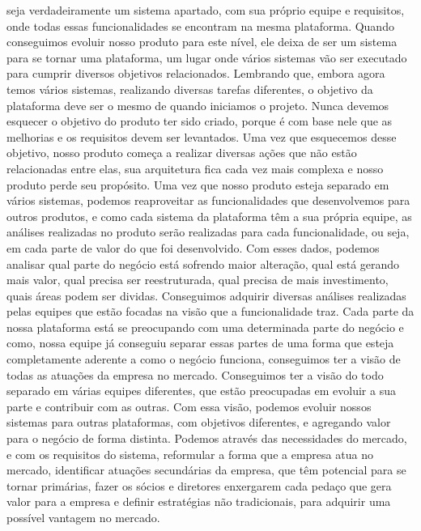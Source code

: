       seja verdadeiramente um sistema apartado, com sua próprio equipe e requisitos,
      onde todas essas funcionalidades se encontram na mesma plataforma. Quando
      conseguimos evoluir nosso produto para este nível, ele deixa de ser um sistema
      para se tornar uma plataforma, um lugar onde vários sistemas vão ser executado
      para cumprir diversos objetivos relacionados. Lembrando que, embora agora
      temos vários sistemas, realizando diversas tarefas diferentes, o objetivo
      da plataforma deve ser o mesmo de quando iniciamos o projeto. Nunca devemos
      esquecer o objetivo do produto ter sido criado, porque é com base nele que
      as melhorias e os requisitos devem ser levantados. Uma vez que esquecemos
      desse objetivo, nosso produto começa a realizar diversas ações que não
      estão relacionadas entre elas, sua arquitetura fica cada vez mais complexa
      e nosso produto perde seu propósito. \newline
      Uma vez que nosso produto esteja separado em vários sistemas, podemos reaproveitar
      as funcionalidades que desenvolvemos para outros produtos, e como cada sistema
      da plataforma têm a sua própria equipe, as análises realizadas no produto
      serão realizadas para cada funcionalidade, ou seja, em cada parte de valor
      do que foi desenvolvido. Com esses dados, podemos analisar qual parte do negócio
      está sofrendo maior alteração, qual está gerando mais valor, qual precisa
      ser reestruturada, qual precisa de mais investimento, quais áreas podem ser
      dividas. Conseguimos adquirir diversas análises realizadas pelas equipes que
      estão focadas na visão que a funcionalidade traz. Cada parte da nossa plataforma
      está se preocupando com uma determinada parte do negócio e como, nossa equipe
      já conseguiu separar essas partes de uma forma que esteja completamente
      aderente a como o negócio funciona, conseguimos ter a visão de todas as atuações
      da empresa no mercado. Conseguimos ter a visão do todo separado em várias
      equipes diferentes, que estão preocupadas em evoluir a sua parte e contribuir
      com as outras. Com essa visão, podemos evoluir nossos sistemas para outras
      plataformas, com objetivos diferentes, e agregando valor para o negócio de
      forma distinta. Podemos através das necessidades do mercado, e com os requisitos
      do sistema, reformular a forma que a empresa atua no mercado, identificar
      atuações secundárias da empresa, que têm potencial para se tornar primárias,
      fazer os sócios e diretores enxergarem cada pedaço que gera valor para a
      empresa e definir estratégias não tradicionais, para adquirir uma possível
      vantagem no mercado.

